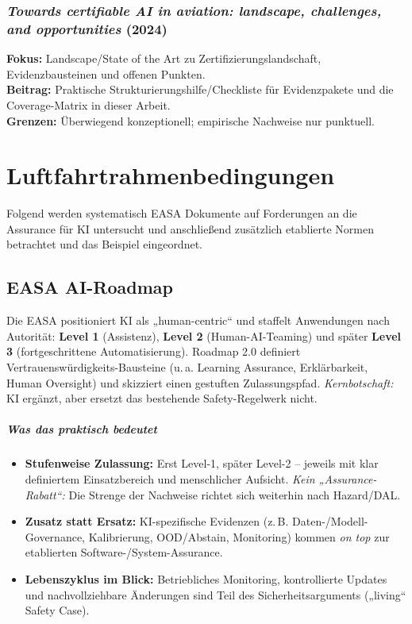 \subsection*{\textit{Towards certifiable AI in aviation: landscape, challenges, and opportunities} (2024)\parencite{towards-certifiable-ai-aviation-2024}}
  \textbf{Fokus:} Landscape/State of the Art zu Zertifizierungslandschaft, Evidenzbausteinen und offenen Punkten.\\
  \textbf{Beitrag:} Praktische Strukturierungshilfe/Checkliste für Evidenzpakete und die Coverage-Matrix in dieser Arbeit.\\
  \textbf{Grenzen:} Überwiegend konzeptionell; empirische Nachweise nur punktuell.








\chapter{Luftfahrtrahmenbedingungen}\label{chap:anf-avi}

Folgend werden systematisch EASA Dokumente auf Forderungen an die Assurance für KI untersucht und 
anschließend zusätzlich etablierte Normen betrachtet und das Beispiel eingeordnet. 

\section{EASA AI-Roadmap \parencite{easa-ai-roadmap-2-2023}}
Die EASA positioniert KI als „human-centric“ und staffelt Anwendungen nach Autorität: \textbf{Level 1} (Assistenz), 
\textbf{Level 2} (Human-AI-Teaming) und später \textbf{Level 3} (fortgeschrittene Automatisierung). 
Roadmap 2.0 definiert Vertrauenswürdigkeits-Bausteine (u.\,a. Learning Assurance, Erklärbarkeit, Human Oversight) 
und skizziert einen gestuften Zulassungspfad. \emph{Kernbotschaft:} KI ergänzt, aber ersetzt das bestehende Safety-Regelwerk nicht.
\paragraph{Was das praktisch bedeutet}
\begin{itemize}
  \item \textbf{Stufenweise Zulassung:} Erst Level-1, später Level-2 – jeweils mit klar definiertem Einsatzbereich und menschlicher Aufsicht. \emph{Kein „Assurance-Rabatt“:} Die Strenge der Nachweise richtet sich weiterhin nach Hazard/DAL.
  \item \textbf{Zusatz statt Ersatz:} KI-spezifische Evidenzen (z.\,B. Daten-/Modell-Governance, Kalibrierung, OOD/Abstain, Monitoring) kommen \emph{on top} zur etablierten Software-/System-Assurance.
  \item \textbf{Lebenszyklus im Blick:} Betriebliches Monitoring, kontrollierte Updates und nachvollziehbare Änderungen sind Teil des Sicherheitsarguments („living“ Safety Case).
\end{itemize}



